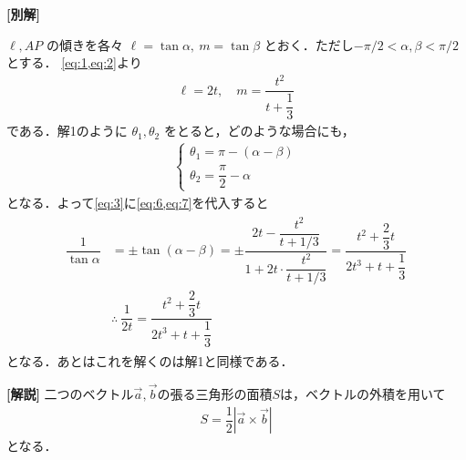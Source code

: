 \documentclass[../../main.tex]{subfiles}
\begin{document}
{\bf [別解]}

$\ell,AP$ の傾きを各々 $\ell=\tan\alpha,\ m=\tan\beta$ とおく．ただし$-\pi/2<\alpha,\beta<\pi/2$とする．
\cref{eq:1,eq:2}より
\begin{align}
  \ell=2t,\quad m=\dfrac{t^2}{t+\dfrac{1}{3}} \label{eq:6}
\end{align}
である．解1のように $\theta_1,\theta_2$ をとると，どのような場合にも，
\begin{align}
  \begin{cases}
    \theta_1=\pi-(\alpha-\beta) \\
    \theta_2=\dfrac{\pi}{2}-\alpha
  \end{cases} \label{eq:7}
\end{align}
となる．よって\cref{eq:3}に\cref{eq:6,eq:7}を代入すると
\begin{align}
  \begin{split}
    \dfrac{1}{\tan\alpha}&=\pm\tan(\alpha-\beta)=\pm\dfrac{2t-\dfrac{t^2}{t+1/3}}{1+2t\cdot\dfrac{t^2}{t+1/3}}=\dfrac{t^2+\dfrac{2}{3}t}{2t^3+t+\dfrac{1}{3}} \\
    &\therefore\ \dfrac{1}{2t}=\dfrac{t^2+\dfrac{2}{3}t}{2t^3+t+\dfrac{1}{3}}
  \end{split}
\end{align}
となる．あとはこれを解くのは解1と同様である．

{\bf [解説]}
二つのベクトル$\vec{a}, \vec{b}$の張る三角形の面積$S$は，ベクトルの外積を用いて
\begin{align}
  S = \dfrac{1}{2}\left|\vec{a}\times\vec{b}\right|
\end{align}
となる．

\newpage
\end{document}
